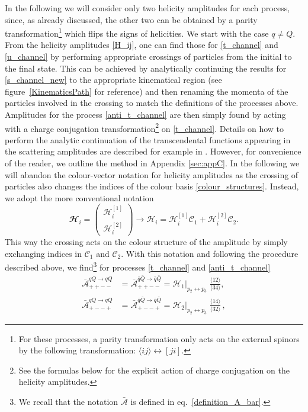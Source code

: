 In the following we will consider only two helicity amplitudes for each process, since,  as already discussed,  the other two can be obtained by a parity transformation\footnote{For these processes,
a parity transformation only
acts on the external spinors by the following transformation: $ \langle ij \rangle  \leftrightarrow [ji]$.} which flips the signs of helicities.
We start with the case $q \neq Q$.  From the helicity amplitudes \eqref{H_ij},  one can find those for  \eqref{t_channel} and \eqref{u_channel}  by performing appropriate crossings of particles from the initial to the final state.  This can be achieved by analytically continuing the results for \eqref{s_channel_new} to the appropriate kinematical region (see figure~\ref{KinematicsPath} for reference) and then renaming the momenta of the particles involved in the crossing to match the definitions of the processes above.  Amplitudes for the process \eqref{anti_t_channel} are then simply found by acting with a charge conjugation transformation\footnote{See the formulas below for the explicit action of charge conjugation on the helicity amplitudes. } on \eqref{t_channel}.
Details on how to perform the analytic continuation of the transcendental functions appearing in the scattering amplitudes are described for example in \cite{Anastasiou:2000mf}.  However,  for convenience of the reader,  we outline the method in Appendix \ref{sec:appC}.  
In the following we will abandon the colour-vector notation for helicity amplitudes as the crossing of particles also changes the indices of the colour basis \eqref{colour_structures}. Instead, we adopt the more conventional notation
\begin{equation}
\mathbfcal{H}_i =
\begin{pmatrix}
{\mathcal{H}}_i^{[1]}  \\
{\mathcal{H}}_i^{[2]} 
\end{pmatrix} 
\longrightarrow  \mathcal{H}_i = \mathcal{H}_i^{[1]} \mathcal{C}_1 +  \mathcal{H}_i^{[2]} \mathcal{C}_2.
\end{equation}
This way the crossing acts on the colour structure of the amplitude by simply exchanging indices in $\mathcal{C}_1$ and $\mathcal{C}_2$.
With this notation and following the procedure described above, we find\footnote{We recall that the notation $\bar{\mathcal{A}}$ is defined in eq.~\eqref{definition_A_bar}.}  for processes \eqref{t_channel} and \eqref{anti_t_channel}
\begin{align}
\bar{\mathcal{A}}_{++--}^{\scriptstyle qQ\rightarrow qQ} &=\bar{\mathcal{A}}_{++--}^{\scriptstyle \bar q\bar Q\rightarrow \bar q\bar Q} = \mathcal{H}_1|_{p_2 \leftrightarrow p_3}  \;  \frac{ \langle 12 \rangle}{\langle 34 \rangle},   \\[8pt]
\bar{\mathcal{A}}_{+--+}^{\scriptstyle qQ\rightarrow qQ} &= \bar{\mathcal{A}}_{+--+}^{\scriptstyle \bar q\bar Q\rightarrow \bar q\bar Q} =\mathcal{H}_2|_{p_2 \leftrightarrow p_3}  \; \frac{ \langle 14 \rangle}{\langle 32 \rangle}\,, \label{anti_t_channel_2}
\end{align}
